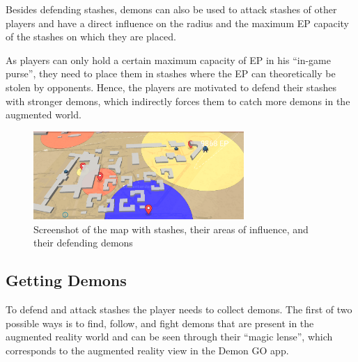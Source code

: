 Besides defending stashes, demons can also be used to attack stashes of other players and have a direct influence on the radius and the maximum EP capacity of the stashes on which they are placed.

As players can only hold a certain maximum capacity of EP in his \enquote{in-game purse}, they need to place them in stashes where the EP can theoretically be stolen by opponents. 
Hence, the players are motivated to defend their stashes with stronger demons, which indirectly forces them to catch more demons in the augmented world.

\begin{figure}
    \includegraphics[width=8cm]{graphics/map.png}
    \caption{Screenshot of the map with stashes, their areas of influence, and their defending demons}
    \label{fig:map}
\end{figure}




\subsection{Getting Demons}
\label{subsec:demons}

To defend and attack stashes the player needs to collect demons.
The first of two possible ways is to find, follow, and fight demons that are present in the augmented reality world and can be seen through their \enquote{magic lense}, which corresponds to the augmented reality view in the Demon GO app.

